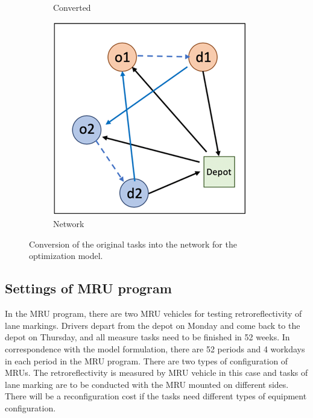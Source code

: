 \documentclass[numbered]{trbunofficial}
\begin{document}
\begin{figure}[!ht]
\begin{subfigure}[b]{0.31\textwidth}
    \caption{Converted}
    \label{fig:2-2}
    \end{subfigure}
    \begin{subfigure}[b]{0.31\textwidth}
    \includegraphics[width=\textwidth]{figures/fig2-3.PNG}
    \caption{Network}
    \label{fig:2-3}
    \end{subfigure}
    \caption{Conversion of the original tasks into the network for the optimization model.}
\end{figure}


\subsection{Settings of MRU program}
In the MRU program, there are two MRU vehicles for testing retroreflectivity of lane markings. Drivers depart from the depot on Monday and come back to the depot on Thursday, and all measure tasks need to be finished in 52 weeks. In correspondence with the model formulation, there are 52 periods and 4 workdays in each period in the MRU program. There are two types of configuration of MRUs. The retroreflectivity is measured by MRU vehicle in this case and tasks of lane marking are to be conducted with the MRU mounted on different sides. There will be a reconfiguration cost if the tasks need different types of equipment configuration.
\end{document}

